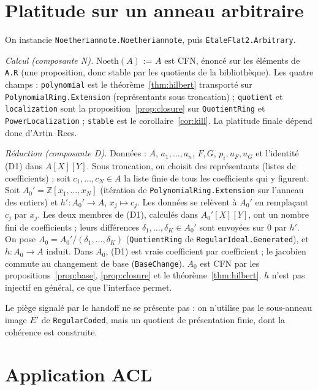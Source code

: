 \documentclass[11pt]{amsart}
\theoremstyle{definition}
\theoremstyle{remark}
\begin{document}
\section{Platitude sur un anneau arbitraire}\label{sec:flat}

On instancie \texttt{Noetheriannote.Noetheriannote}, puis
\texttt{EtaleFlat2.Arbitrary}.

\emph{Calcul (composante N).} $\mathrm{Noeth}(A)$ := $A$ est CFN, énoncé
sur les éléments de \texttt{A.R} (une proposition, donc stable par les
quotients de la bibliothèque). Les quatre champs :
\texttt{polynomial} est le théorème~\ref{thm:hilbert} transporté sur
\texttt{PolynomialRing.Extension} (représentants sous troncation) ;
\texttt{quotient} et \texttt{localization} sont la
proposition~\ref{prop:closure} sur \texttt{QuotientRing} et
\texttt{PowerLocalization} ; \texttt{stable} est le
corollaire~\ref{cor:kill}. La platitude finale dépend donc d'Artin--Rees.

\emph{Réduction (composante D).} Données : $A$, $a_1,\dots,a_n$, $F,G$,
$p_i,u_F,u_G$ et l'identité (D1) dans $A[X][Y]$. Sous troncation, on
choisit des représentants (listes de coefficients) ; soit
$c_1,\dots,c_N\in A$ la liste finie de tous les coefficients qui y
figurent. Soit $A_0'=\mathbb Z[x_1,\dots,x_N]$ (itération de
\texttt{PolynomialRing.Extension} sur l'anneau des entiers) et
$h':A_0'\to A$, $x_j\mapsto c_j$. Les données se relèvent à $A_0'$ en
remplaçant $c_j$ par $x_j$. Les deux membres de (D1), calculés dans
$A_0'[X][Y]$, ont un nombre fini de coefficients ; leurs différences
$\delta_1,\dots,\delta_K\in A_0'$ sont envoyées sur $0$ par $h'$. On pose
$A_0=A_0'/(\delta_1,\dots,\delta_K)$ (\texttt{QuotientRing} de
\texttt{RegularIdeal.Generated}), et $h:A_0\to A$ induit. Dans $A_0$,
(D1) est vraie coefficient par coefficient ; le jacobien commute au
changement de base (\texttt{BaseChange}). $A_0$ est CFN par les
propositions~\ref{prop:base}, \ref{prop:closure} et le
théorème~\ref{thm:hilbert}. $h$ n'est pas injectif en général, ce que
l'interface permet.

Le piège signalé par le handoff ne se présente pas : on n'utilise pas le
sous-anneau image $E'$ de \texttt{RegularCoded}, mais un quotient de
présentation finie, dont la cohérence est construite.

\section{Application ACL}\label{sec:acl}
\end{document}
